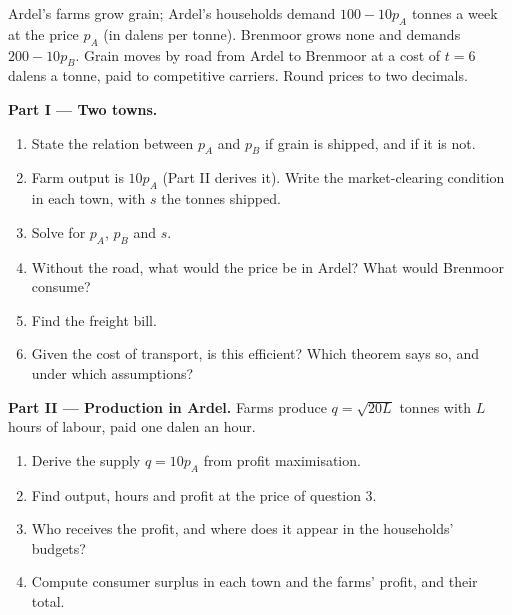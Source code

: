 \begin{problem}
\label{pb:b2:welfare-theorems:1}
Ardel's farms grow grain; Ardel's households demand $100 - 10p_A$ tonnes a week at the price $p_A$ (in
dalens per tonne). Brenmoor grows none and demands $200 - 10p_B$. Grain moves by road from Ardel to
Brenmoor at a cost of $t = 6$ dalens a tonne, paid to competitive carriers. Round prices to two decimals.

\medskip
\noindent\textbf{Part I --- Two towns.}
\begin{enumerate}
  \item State the relation between $p_A$ and $p_B$ if grain is shipped, and if it is not.
  \item Farm output is $10p_A$ (Part II derives it). Write the market-clearing condition in each town,
        with $s$ the tonnes shipped.
  \item Solve for $p_A$, $p_B$ and $s$.
  \item Without the road, what would the price be in Ardel? What would Brenmoor consume?
  \item Find the freight bill.
  \item Given the cost of transport, is this  efficient? Which theorem says so, and under
        which assumptions?
\end{enumerate}

\medskip
\noindent\textbf{Part II --- Production in Ardel.} Farms produce $q = \sqrt{20L}$ tonnes with $L$ hours
of labour, paid one dalen an hour.
\begin{enumerate}[resume]
  \item Derive the supply $q = 10p_A$ from profit maximisation.
  \item Find output, hours and profit at the price of question 3.
  \item Who receives the profit, and where does it appear in the households' budgets?
  \item Compute consumer surplus in each town and the farms' profit, and their total.
\end{enumerate}


\end{problem}
